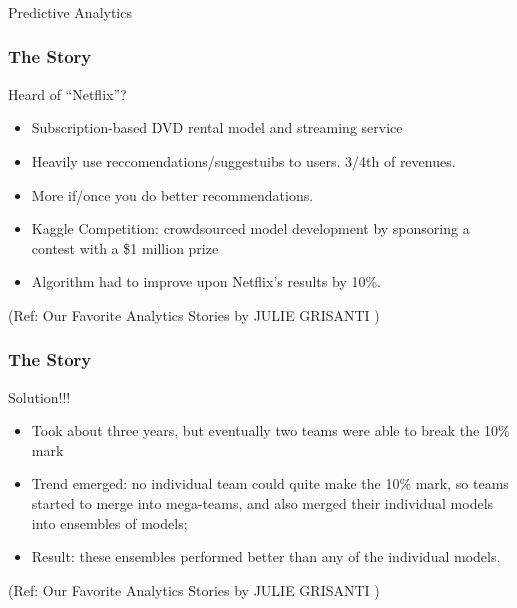 \begin{frame}[fragile]\frametitle{}
\begin{center}
{\Large Predictive Analytics}


\end{center}


\end{frame}

\begin{frame}\frametitle{The Story}
Heard of ``Netflix''?
\begin{itemize}
\item Subscription-based DVD rental model and streaming service
\item Heavily use reccomendations/suggestuibs to users. 3/4th of revenues.
\item More if/once you do better recommendations.
\item Kaggle Competition: crowdsourced model development by sponsoring a contest with a \$1 million prize
\item Algorithm had to improve upon Netflix’s results by 10\%. 
\end{itemize}

{\tiny (Ref: Our Favorite Analytics Stories by JULIE GRISANTI )}

\end{frame}

\begin{frame}\frametitle{The Story}
Solution!!!
\begin{itemize}
\item Took about three years, but eventually two teams were able to break the 10\% mark
\item Trend emerged: no individual team could quite make the 10\% mark, 
so teams started to merge into mega-teams, 
and also merged their individual models into ensembles of models; 
\item Result: these ensembles performed better than any of the individual models. 

\end{itemize}

{\tiny (Ref: Our Favorite Analytics Stories by JULIE GRISANTI )}

\end{frame}

